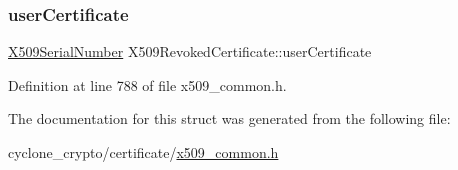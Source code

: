 \subsubsection{\texorpdfstring{user\+Certificate}{userCertificate}}
{\footnotesize\ttfamily \hyperlink{structX509SerialNumber}{X509\+Serial\+Number} X509\+Revoked\+Certificate\+::user\+Certificate}



Definition at line 788 of file x509\+\_\+common.\+h.



The documentation for this struct was generated from the following file\+:\begin{DoxyCompactItemize}
\item 
cyclone\+\_\+crypto/certificate/\hyperlink{certificate_2x509__common_8h}{x509\+\_\+common.\+h}\end{DoxyCompactItemize}
